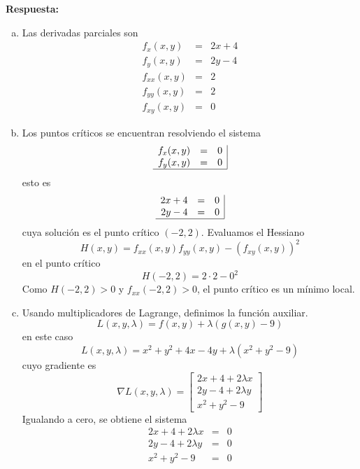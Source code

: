 \documentclass{article}
\begin{document}
\begin{enumerate}[{\bf P1)}, leftmargin=*, labelsep=3mm]
  \vspace{5mm}
  \noindent\textbf{Respuesta:}
    \begin{enumerate}[a)]
      \item Las derivadas parciales son
        \begin{eqnarray*}
          f_x(x,y) &=& 2x + 4\\
          f_y(x,y) &=& 2y - 4\\
          f_{xx}(x,y) &=& 2\\
          f_{yy}(x,y) &=& 2\\
          f_{xy}(x,y) &=& 0
        \end{eqnarray*}
      \item Los puntos críticos se encuentran resolviendo el sistema
        $$\begin{array}{rcl|}
          f_x(x,y) &=& 0\\
          f_y(x,y) &=& 0\\
          \hline
        \end{array}$$
        esto es
        $$\begin{array}{rcl|}
          2x + 4 &=& 0\\
          2y - 4 &=& 0\\
          \hline
        \end{array}$$
        cuya solución es el punto crítico $(-2,2)$. Evaluamos el Hessiano
          $$H(x,y) = f_{xx}(x,y) f_{yy}(x,y) - (f_{xy}(x,y))^2$$
        en el punto crítico
          $$H(-2,2) = 2\cdot 2 - 0^2$$
        Como $H(-2,2) > 0$ y $f_{xx}(-2,2) > 0$, el punto crítico es un mínimo local.
      \newpage
      \item Usando multiplicadores de Lagrange, definimos la función auxiliar.
        $$L(x,y,\lambda) = f(x,y) + \lambda (g(x,y) - 9)$$
        en este caso
        $$L(x,y,\lambda) = x^2 + y^2 + 4x - 4y + \lambda (x^2 + y^2 - 9)$$
        cuyo gradiente es
        $$\nabla L(x,y,\lambda) = \begin{bmatrix}
          2x + 4 + 2\lambda x\\
          2y - 4 + 2\lambda y\\
          x^2 + y^2 - 9
        \end{bmatrix}$$
        Igualando a cero, se obtiene el sistema
        $$\begin{array}{rcl|}
          2x + 4 + 2\lambda x &=& 0\\
          2y - 4 + 2\lambda y &=& 0\\
          x^2 + y^2 - 9 &=& 0\\

\end{array}$$
\end{enumerate}
\end{enumerate}
\end{document}

